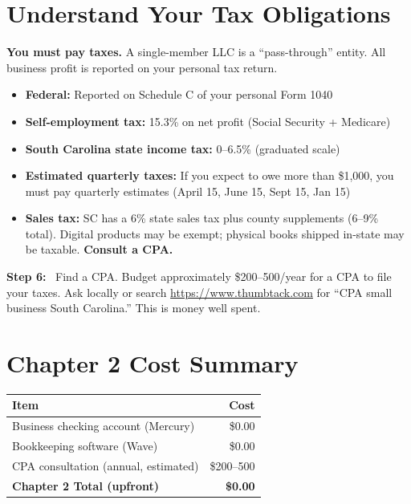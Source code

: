 \documentclass[12pt, letterpaper, oneside]{book}
\newcommand{\step}[1]{\noindent\textbf{\textcolor{primary}{Step #1:}}~}
\begin{document}
\section{Understand Your Tax Obligations}

\begin{warningbox}
\textbf{You must pay taxes.} A single-member LLC is a ``pass-through'' entity. All business profit is reported on your personal tax return.
\begin{itemize}[leftmargin=1.5em]
  \item \textbf{Federal:} Reported on Schedule C of your personal Form 1040
  \item \textbf{Self-employment tax:} 15.3\% on net profit (Social Security + Medicare)
  \item \textbf{South Carolina state income tax:} 0--6.5\% (graduated scale)
  \item \textbf{Estimated quarterly taxes:} If you expect to owe more than \$1{,}000, you must pay quarterly estimates (April 15, June 15, Sept 15, Jan 15)
  \item \textbf{Sales tax:} SC has a 6\% state sales tax plus county supplements (6--9\% total). Digital products may be exempt; physical books shipped in-state may be taxable. \textbf{Consult a CPA.}
\end{itemize}
\end{warningbox}

\step{6} Find a CPA. Budget approximately \$200--500/year for a CPA to file your taxes. Ask locally or search \url{https://www.thumbtack.com} for ``CPA small business South Carolina.'' This is money well spent.

\section{Chapter 2 Cost Summary}

\begin{table}[H]
\centering
\begin{tabular}{lr}
\toprule
\textbf{Item} & \textbf{Cost} \\
\midrule
Business checking account (Mercury) & \$0.00 \\
Bookkeeping software (Wave) & \$0.00 \\
CPA consultation (annual, estimated) & \$200--500 \\
\midrule
\textbf{Chapter 2 Total (upfront)} & \textbf{\$0.00} \\
\bottomrule
\end{tabular}
\end{table}
\end{document}
